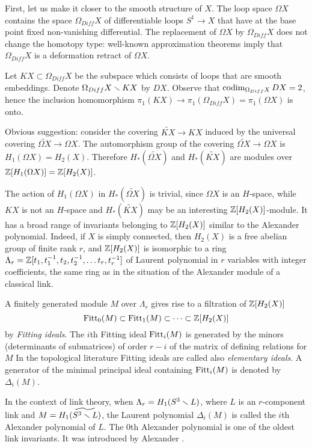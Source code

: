 \documentclass{article}
\begin{document}
First, let us make it closer to the smooth structure of $X$. The loop space 
$\Omega X$ contains the space $\Omega_{Diff}X$ of differentiable loops 
$S^1\to X$ that have at the base point fixed non-vanishing differential. 
The replacement of $\Omega X$ by $\Omega_{Diff}X$ does not change the 
homotopy type: well-known approximation theorems imply that 
$\Omega_{Diff}X$ is a deformation retract of $\Omega X$. 

Let $KX\subset \Omega_{Diff}X$ be the subspace which consists of loops that are 
smooth embeddings. Denote $\Omega_{Diff}X\smallsetminus KX$ by $DX$.
Observe that $\operatorname{codim}_{\Omega_{Diff}X}DX=2$,  hence the 
inclusion homomorphism
$\pi_1(KX)\to\pi_1(\Omega_{Diff} X)=\pi_1(\Omega X)$ is onto. 

Obvious suggestion: 
consider the covering $\widetilde{KX}\to KX$ induced by the universal
covering  $\widetilde{\Omega X}\to \Omega X$. The automorphism group 
of the covering $\widetilde{\Omega X}\to \Omega X$ is $H_1(\Omega
X)=H_2(X)$. Therefore $H_*(\widetilde{\Omega X})$ and 
$H_*(\widetilde{KX})$ are modules over %
$\mathbb Z[H_1(\Omega X)]=\mathbb Z[H_2(X)]$.

The action of $H_1(\Omega X)$ in $H_*(\widetilde{\Omega X})$ is trivial,
since $\Omega X$ is an $H$-space, while $KX$ is not an $H$-space and 
$H_*(\widetilde{KX})$ may be an interesting $\mathbb Z[H_2(X)]$-module. 
It has a broad range of invariants belonging to $\mathbb Z[H_2(X)]$
similar to the Alexander polynomial. Indeed, if $X$ is simply connected,
then $H_2(X)$ is a free abelian group of finite rank $r$, and $\mathbb Z[H_2(X)]$ is
isomorphic to a ring $\Lambda_r=\mathbb Z[t_1,t_1^{-1},t_2,t_2^{-1},\dots 
t_r,t_r^{-1}]$
of Laurent polynomial in $r$ variables with integer
coefficients, the same ring as in the situation of the Alexander module of a
classical link. 


A finitely generated module $M$ over $\Lambda_r$ gives rise to a
filtration  of $\mathbb Z[H_2(X)]$
$$\operatorname{Fitt}_0(M)\subset\operatorname{Fitt}_1(M)\subset\dots\subset\mathbb Z[H_2(X)]$$ 
by {\em Fitting ideals\/}.  The $i$th Fitting ideal $\operatorname{Fitt}_i(M)$ is 
generated by the minors (determinants of submatrices) of order $r-i$ 
of the matrix of defining relations for $M$   
In the topological literature Fitting ideals are called also {\em
elementary ideals\/}. A generator of the minimal principal ideal 
containing $\operatorname{Fitt}_i(M)$ is denoted by $\Delta_i(M)$. 

In the context of link theory, when $\Lambda_r=H_1(S^3\smallsetminus L)$, where 
$L$ is an $r$-component link and $M=H_1(\widetilde{S^3\smallsetminus L})$, the
Laurent polynomial $\Delta_i(M)$ is called the $i$th Alexander polynomial
of $L$. The $0$th Alexander polynomial is one of the oldest link
invariants. It was introduced by Alexander \cite{Al}. 
\end{document}
